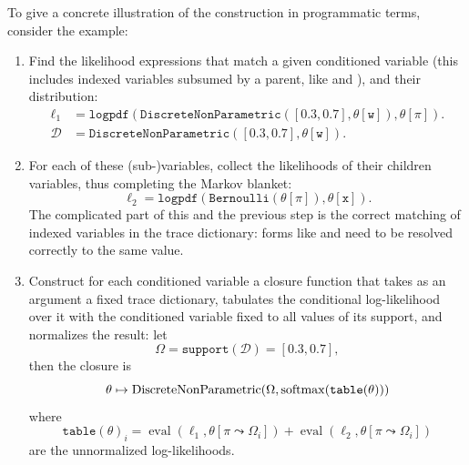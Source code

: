 To give a concrete illustration of the construction in programmatic terms, consider the
 example:
\begin{enumerate}
  \firmlist
\item Find the likelihood expressions that match a given conditioned variable (this includes indexed
  variables subsumed by a parent, like  and ), and their distribution:
  \begin{equation*}
    \begin{aligned}
      \ell_{1} &= \mathtt{logpdf(DiscreteNonParametric([0.3, 0.7],\theta[w]), \theta[\pi])}. \\
      \mathcal{D} &= \mathtt{DiscreteNonParametric([0.3, 0.7], \theta[w])}.
    \end{aligned}
  \end{equation*}
\item For each of these (sub-)variables, collect the likelihoods of their children variables, thus
  completing the Markov blanket:
  \begin{equation*}
    \ell_{2} = \mathtt{logpdf(Bernoulli(\theta[\pi]), \theta[x])}.
  \end{equation*}
  The complicated part of this and the previous step is the correct matching of indexed variables in
  the trace dictionary: forms like  and  need to be resolved correctly
  to the same value.
\item Construct for each conditioned variable a closure function that takes as an argument a fixed
  trace dictionary, tabulates the conditional log-likelihood over it with the conditioned variable
  fixed to all values of its support, and normalizes the result: let
  \begin{equation*}
    \Omega = \mathtt{support}(\mathcal{D}) = \mathtt{[0.3, 0.7]},
  \end{equation*}
  then the closure is
  \begin{equation*}
    \theta \mapsto \mathrm{DiscreteNonParametric}(\Omega, \operatorname{softmax}(\mathtt{table}(\theta)))
  \end{equation*}
  where
  \begin{equation*}
    \mathtt{table}(\theta)_i = \operatorname{eval}(\ell_{1}, \theta[\pi \leadsto \Omega_i]) +
    \operatorname{eval}(\ell_{2}, \theta[\pi \leadsto \Omega_i])
  \end{equation*}
  are the unnormalized log-likelihoods.

\end{enumerate}
